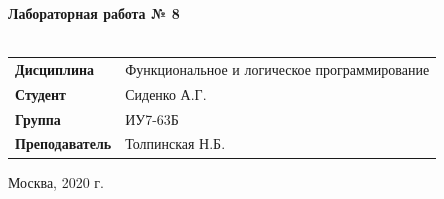 \documentclass[a4paper,14pt]{extreport} %
\begin{document}
\begin{titlepage}
    \vspace{2cm}

    \begin{center}
        \textbf{Лабораторная работа № 8} \\
        \vspace{0.5cm}
        \textbf{} \\
    \end{center}

    \vspace{4cm}

    \begin{flushleft}
        \begin{tabular}{ll}
            \textbf{Дисциплина} & Функциональное и логическое программирование \\
            \textbf{Студент} & Сиденко А.Г. \\
            \textbf{Группа} & ИУ7-63Б \\
            \textbf{Преподаватель} & Толпинская Н.Б.  \\
        \end{tabular}
    \end{flushleft}

    \vspace{4cm}

   \begin{center}
        Москва, 2020 г.
    \end{center}

\end{titlepage}
\end{document}
